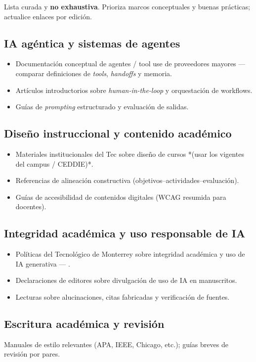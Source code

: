 
Lista curada y \textbf{no exhaustiva}. Prioriza marcos conceptuales y buenas prácticas; actualice enlaces por edición.

\subsection*{IA agéntica y sistemas de agentes}
\begin{itemize}
\item Documentación conceptual de agentes / tool use de proveedores mayores --- comparar definiciones de \emph{tools}, \emph{handoffs} y memoria.
\item Artículos introductorios sobre \emph{human-in-the-loop} y orquestación de workflows.
\item Guías de \emph{prompting} estructurado y evaluación de salidas.
\end{itemize}

\subsection*{Diseño instruccional y contenido académico}
\begin{itemize}
\item Materiales institucionales del Tec sobre diseño de cursos *(usar los vigentes del campus / CEDDIE)*.
\item Referencias de alineación constructiva (objetivos--actividades--evaluación).
\item Guías de accesibilidad de contenidos digitales (WCAG resumida para docentes).
\end{itemize}

\subsection*{Integridad académica y uso responsable de IA}
\begin{itemize}
\item Políticas del Tecnológico de Monterrey sobre integridad académica y uso de IA generativa --- \ceddie.
\item Declaraciones de editores sobre divulgación de uso de IA en manuscritos.
\item Lecturas sobre alucinaciones, citas fabricadas y verificación de fuentes.
\end{itemize}

\subsection*{Escritura académica y revisión}
Manuales de estilo relevantes (APA, IEEE, Chicago, etc.); guías breves de revisión por pares.

